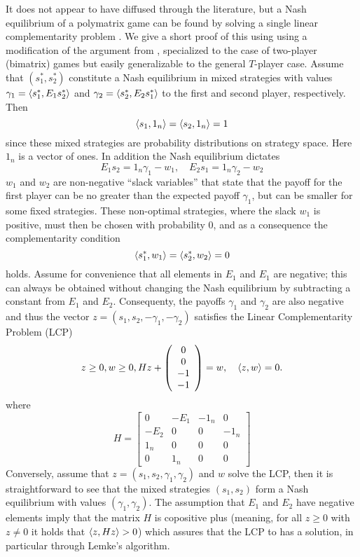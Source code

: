 It does not appear to have diffused through the literature, but a Nash equilibrium of a polymatrix game can be found by solving a single linear complementarity problem \citep{miller1991copositive}. We give a short proof of this using using a modification of the argument from \citep{miller1991copositive}, specialized to the case of two-player (bimatrix) games but easily generalizable to the general $T$-player case. Assume that $(s^*_1,s^*_2)$ constitute a Nash equilibrium in mixed strategies with values $\gamma_1 = \left \langle s^*_1,E_1 s^*_2 \right \rangle$ and  $\gamma_2 = \left \langle s^*_2,E_2 s^*_1 \right \rangle$ to the first and second player, respectively. Then
\[
  \left \langle s_1,1_n \right \rangle =
  \left \langle s_2,1_n \right \rangle =
  1
\]
since these mixed strategies are probability distributions on strategy space. Here $1_n$ is a vector of ones. In addition the Nash equilibrium dictates
\[
  E_1 s_2 = 1_n \gamma_1 - w_1
  ,\quad
  E_2 s_1 = 1_n \gamma_2  - w_2
\]
$w_1$ and $w_2$ are non-negative ``slack variables'' that state that the payoff for the first player can be no greater than the expected payoff $\gamma_1$, but can be smaller for some fixed strategies. These non-optimal strategies, where the slack $w_1$ is positive, must then be chosen with probability 0, and as a consequence the complementarity condition
\[
  \left \langle s^*_1,w_1 \right \rangle = \left \langle s^*_2,w_2 \right \rangle = 0
\]
holds. Assume for convenience that all elements in $E_1$ and $E_1$ are negative; this can always be obtained without changing the Nash equilibrium by subtracting a constant from $E_1$ and $E_2$. Consequenty, the payoffs $\gamma_1$ and $\gamma_2$ are also negative and thus the vector $z = (s_1,s_2,-\gamma_1,-\gamma_2)$ satisfies the Linear Complementarity Problem (LCP)
\begin{equation}
  z \geq 0,
  w \geq 0 ,
  H
  z
  +
  \left(
    \begin{array}{c}
      0 \\
      0 \\
      -1 \\
      -1
    \end{array}
  \right)
  =
  w
  ,
  \quad
  \left \langle z,w \right \rangle = 0
  .  \label{eq:lcp}
\end{equation}
where
\[
  H =
  \left[
    \begin{array}{cccc}
      0 & -E_1 & -1_n & 0 \\ -E_2 & 0 & 0 & -1_n \\
      1_n & 0 & 0 & 0 \\
      0 & 1_n & 0 & 0
    \end{array}
  \right]
\]
Conversely, assume that $z=(s_1,s_2,\gamma_1,\gamma_2)$ and $w$ solve the LCP, then it is straightforward to see that the mixed strategies $(s_1,s_2)$ form a Nash equilibrium with values $(\gamma_1,\gamma_2)$. The assumption that $E_1$ and $E_2$ have negative elements imply that the matrix $H$ is copositive plus (meaning, for all $z\geq0$ with $z\neq0$ it holds that $\left \langle z,Hz \right \rangle>0$) which assures that the LCP to has a solution, in particular through Lemke's algorithm.

